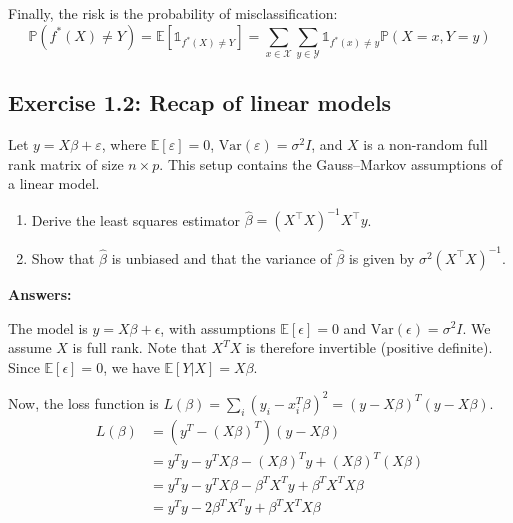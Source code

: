 \vspace{0.2cm}

Finally, the risk is the probability of misclassification:
\[ \mathbb{P}(f^*(X) \neq Y) = \mathbb{E}[\mathds{1}_{f^*(X) \neq Y}] = \sum_{x \in \mathcal{X}} \sum_{y \in \mathcal{Y}} \mathds{1}_{f^*(x) \neq y} \mathbb{P}(X=x, Y=y) \]

\subsection*{Exercise 1.2: Recap of linear models}

Let \(y = X\beta + \varepsilon\), where \(\mathbb{E}[\varepsilon] = 0\), 
\(\mathrm{Var}(\varepsilon) = \sigma^2 I\), 
and \(X\) is a non-random full rank matrix of size \(n \times p\). 
This setup contains the Gauss--Markov assumptions of a linear model.

\begin{enumerate}
    \item Derive the least squares estimator 
    \(\hat{\beta} = (X^{\top}X)^{-1}X^{\top}y\).
    \item Show that \(\hat{\beta}\) is unbiased and that the variance of \(\hat{\beta}\) 
    is given by \(\sigma^2 (X^{\top}X)^{-1}\).
\end{enumerate}

\newpage
\textbf{Answers:}
\vspace{0.2cm}

The model is $y = X\beta + \epsilon$, with assumptions $\mathbb{E}[\epsilon]=0$ and $\text{Var}(\epsilon) = \sigma^2 I$. We assume $X$ is full rank. Note that $X^TX$ is therefore invertible (positive definite).
Since $\mathbb{E}[\epsilon]=0$, we have $\mathbb{E}[Y|X] = X\beta$.

\vspace{0.2cm}

Now, the loss function is $L(\beta) = \sum_i (y_i - x_i^T\beta)^2 = (y - X\beta)^T(y - X\beta)$.
\begin{align*}
    L(\beta) &= (y^T - (X\beta)^T)(y - X\beta) \\
    &= y^Ty - y^T X\beta - (X\beta)^T y + (X\beta)^T(X\beta) \\
    &= y^Ty - y^T X\beta - \beta^T X^T y + \beta^T X^T X \beta \\
    &= y^Ty - 2\beta^T X^T y + \beta^T X^T X \beta
\end{align*}

\vspace{0.2cm}

